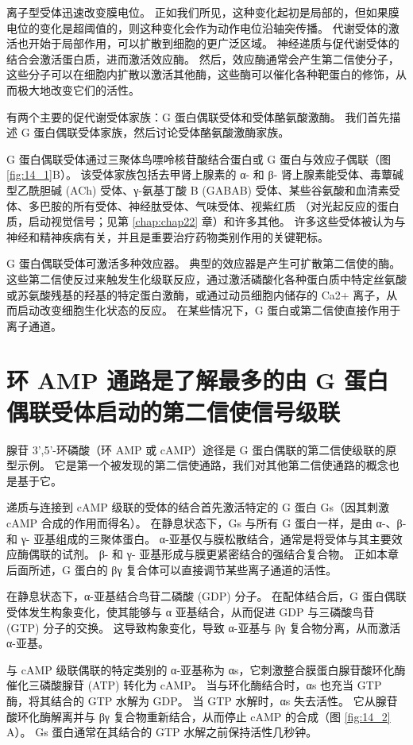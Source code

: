 离子型受体迅速改变膜电位。
正如我们所见，这种变化起初是局部的，但如果膜电位的变化是超阈值的，则这种变化会作为动作电位沿轴突传播。
代谢受体的激活也开始于局部作用，可以扩散到细胞的更广泛区域。
神经递质与促代谢受体的结合会激活蛋白质，进而激活效应酶。
然后，效应酶通常会产生第二信使分子，这些分子可以在细胞内扩散以激活其他酶，这些酶可以催化各种靶蛋白的修饰，从而极大地改变它们的活性。


有两个主要的促代谢受体家族：G 蛋白偶联受体和受体酪氨酸激酶。
我们首先描述 G 蛋白偶联受体家族，然后讨论受体酪氨酸激酶家族。


G 蛋白偶联受体通过三聚体鸟嘌呤核苷酸结合蛋白或 G 蛋白与效应子偶联（图 \ref{fig:14_1}B）。
该受体家族包括去甲肾上腺素的 α- 和 β- 肾上腺素能受体、毒蕈碱型乙酰胆碱 (ACh) 受体、γ-氨基丁酸 B (GABAB) 受体、某些谷氨酸和血清素受体、多巴胺的所有受体、神经肽受体、气味受体、视紫红质 （对光起反应的蛋白质，启动视觉信号；见第 \ref{chap:chap22} 章）和许多其他。
许多这些受体被认为与神经和精神疾病有关，并且是重要治疗药物类别作用的关键靶标。


G 蛋白偶联受体可激活多种效应器。
典型的效应器是产生可扩散第二信使的酶。
这些第二信使反过来触发生化级联反应，通过激活磷酸化各种蛋白质中特定丝氨酸或苏氨酸残基的羟基的特定蛋白激酶，或通过动员细胞内储存的 Ca2+ 离子，从而启动改变细胞生化状态的反应。
在某些情况下，G 蛋白或第二信使直接作用于离子通道。


\section{环 AMP 通路是了解最多的由 G 蛋白偶联受体启动的第二信使信号级联}

腺苷 3',5'-环磷酸（环 AMP 或 cAMP）途径是 G 蛋白偶联的第二信使级联的原型示例。
它是第一个被发现的第二信使通路，我们对其他第二信使通路的概念也是基于它。


递质与连接到 cAMP 级联的受体的结合首先激活特定的 G 蛋白 Gs（因其刺激 cAMP 合成的作用而得名）。 
在静息状态下，Gs 与所有 G 蛋白一样，是由 α-、β- 和 γ- 亚基组成的三聚体蛋白。
α-亚基仅与膜松散结合，通常是将受体与其主要效应酶偶联的试剂。
β- 和 γ- 亚基形成与膜更紧密结合的强结合复合物。 
正如本章后面所述，G 蛋白的 βγ 复合体可以直接调节某些离子通道的活性。


在静息状态下，α-亚基结合鸟苷二磷酸 (GDP) 分子。 
在配体结合后，G 蛋白偶联受体发生构象变化，使其能够与 α 亚基结合，从而促进 GDP 与三磷酸鸟苷 (GTP) 分子的交换。
这导致构象变化，导致 α-亚基与 βγ 复合物分离，从而激活 α-亚基。


与 cAMP 级联偶联的特定类别的 α-亚基称为 αs，它刺激整合膜蛋白腺苷酸环化酶催化三磷酸腺苷 (ATP) 转化为 cAMP。
当与环化酶结合时，αs 也充当 GTP 酶，将其结合的 GTP 水解为 GDP。
当 GTP 水解时，αs 失去活性。 它从腺苷酸环化酶解离并与 βγ 复合物重新结合，从而停止 cAMP 的合成（图 \ref{fig:14_2} A）。
Gs 蛋白通常在其结合的 GTP 水解之前保持活性几秒钟。


